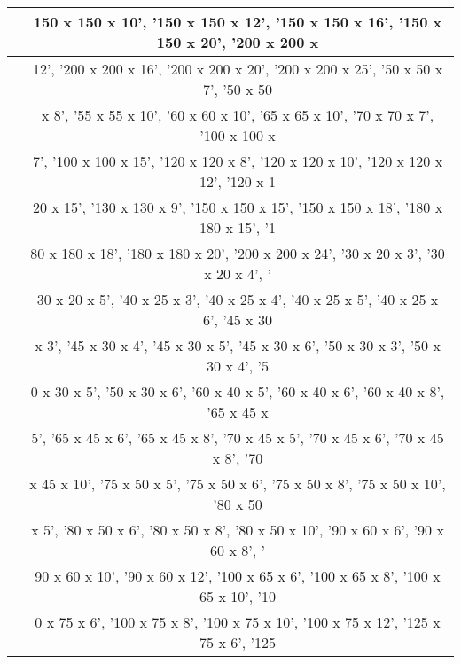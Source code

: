 \documentclass{article}%
\begin{document}
\begin{longtable}{|p{8cm}|p{8cm}|}
\hline%
\hline%
\multicolumn{1}{|c|}{ }&\multicolumn{1}{|c|}{150 x 150 x 10', '150 x 150 x 12', '150 x 150 x 16', '150 x 150 x 20', '200 x 200 x}\\%
\hline%
\hline%
\multicolumn{1}{|c|}{ }&\multicolumn{1}{|c|}{ 12', '200 x 200 x 16', '200 x 200 x 20', '200 x 200 x 25', '50 x 50 x 7', '50 x 50}\\%
\hline%
\hline%
\multicolumn{1}{|c|}{ }&\multicolumn{1}{|c|}{ x 8', '55 x 55 x 10', '60 x 60 x 10', '65 x 65 x 10', '70 x 70 x 7', '100 x 100 x }\\%
\hline%
\hline%
\multicolumn{1}{|c|}{ }&\multicolumn{1}{|c|}{7', '100 x 100 x 15', '120 x 120 x 8', '120 x 120 x 10', '120 x 120 x 12', '120 x 1}\\%
\hline%
\hline%
\multicolumn{1}{|c|}{ }&\multicolumn{1}{|c|}{20 x 15', '130 x 130 x 9', '150 x 150 x 15', '150 x 150 x 18', '180 x 180 x 15', '1}\\%
\hline%
\hline%
\multicolumn{1}{|c|}{ }&\multicolumn{1}{|c|}{80 x 180 x 18', '180 x 180 x 20', '200 x 200 x 24', '30 x 20 x 3', '30 x 20 x 4', '}\\%
\hline%
\hline%
\multicolumn{1}{|c|}{ }&\multicolumn{1}{|c|}{30 x 20 x 5', '40 x 25 x 3', '40 x 25 x 4', '40 x 25 x 5', '40 x 25 x 6', '45 x 30 }\\%
\hline%
\hline%
\multicolumn{1}{|c|}{ }&\multicolumn{1}{|c|}{x 3', '45 x 30 x 4', '45 x 30 x 5', '45 x 30 x 6', '50 x 30 x 3', '50 x 30 x 4', '5}\\%
\hline%
\hline%
\multicolumn{1}{|c|}{ }&\multicolumn{1}{|c|}{0 x 30 x 5', '50 x 30 x 6', '60 x 40 x 5', '60 x 40 x 6', '60 x 40 x 8', '65 x 45 x}\\%
\hline%
\hline%
\multicolumn{1}{|c|}{ }&\multicolumn{1}{|c|}{ 5', '65 x 45 x 6', '65 x 45 x 8', '70 x 45 x 5', '70 x 45 x 6', '70 x 45 x 8', '70}\\%
\hline%
\hline%
\multicolumn{1}{|c|}{ }&\multicolumn{1}{|c|}{ x 45 x 10', '75 x 50 x 5', '75 x 50 x 6', '75 x 50 x 8', '75 x 50 x 10', '80 x 50 }\\%
\hline%
\hline%
\multicolumn{1}{|c|}{ }&\multicolumn{1}{|c|}{x 5', '80 x 50 x 6', '80 x 50 x 8', '80 x 50 x 10', '90 x 60 x 6', '90 x 60 x 8', '}\\%
\hline%
\hline%
\multicolumn{1}{|c|}{ }&\multicolumn{1}{|c|}{90 x 60 x 10', '90 x 60 x 12', '100 x 65 x 6', '100 x 65 x 8', '100 x 65 x 10', '10}\\%
\hline%
\hline%
\multicolumn{1}{|c|}{ }&\multicolumn{1}{|c|}{0 x 75 x 6', '100 x 75 x 8', '100 x 75 x 10', '100 x 75 x 12', '125 x 75 x 6', '125}\\%

\end{longtable}
\end{document}
